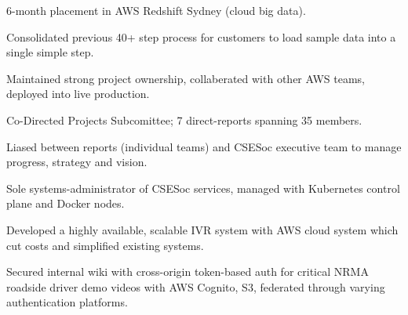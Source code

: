\documentclass[a4paper]{deedy-resume}
\begin{document}
\begin{minipage}[t]{0.66\textwidth}
\sectionspace



\begin{tightitemize}
\item 6-month placement in AWS Redshift Sydney (cloud big data).
\item Consolidated previous 40+ step process for customers
	  to load sample data into a single simple step.
\item Maintained strong project ownership, collaberated with other
	  AWS teams, deployed into live production.
\end{tightitemize}

\sectionspace



\begin{tightitemize}
\item Co-Directed Projects Subcomittee;
	  7 direct-reports spanning 35 members.
\item Liased between reports (individual teams) and
	  CSESoc executive team to manage progress,
	  strategy and vision.
\item Sole systems-administrator of CSESoc services,
	  managed with Kubernetes control plane and
	  Docker nodes.
\end{tightitemize}

\sectionspace



\begin{tightitemize}
\item Developed a highly available, scalable IVR system
	  with AWS cloud system which cut costs and simplified
	  existing systems.
\item Secured internal wiki with cross-origin token-based
	  auth for critical NRMA roadside driver demo videos
	  with AWS Cognito, S3, federated through varying
	  authentication platforms.
\end{tightitemize}


\end{minipage}
\end{document}
